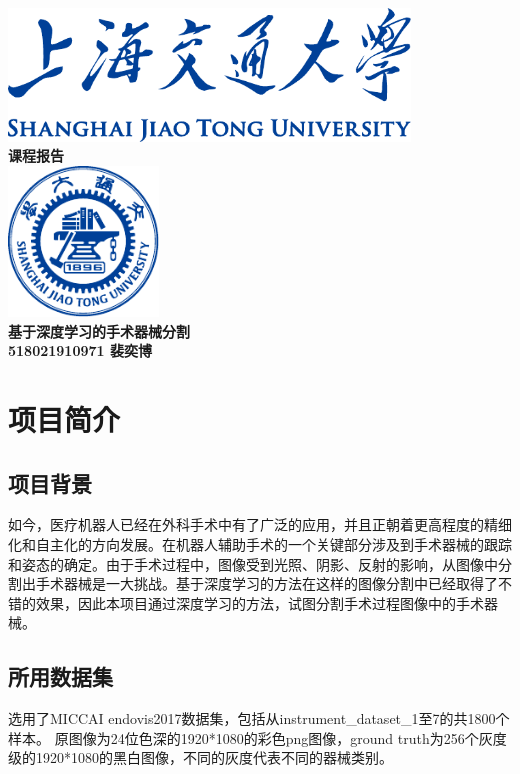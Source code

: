 \documentclass[UTF8]{ctexart}
\begin{document}
\begin{titlepage}
    \begin{center}
        \includegraphics[width=0.8\textwidth]{sjtu-name-blue.pdf}\\[1cm]
        \textsc{\Huge \bfseries 课程报告}\\[1.5cm]
        \includegraphics[width=0.3\textwidth]{sjtu-badge-blue.pdf}\\[0.5cm]    

        \Huge \bfseries{基于深度学习的手术器械分割}\\[1cm]
        \Large \bfseries{518021910971 裴奕博}
    \end{center}
\end{titlepage}
\tableofcontents
\newpage

\section{项目简介}

\subsection{项目背景}
如今，医疗机器人已经在外科手术中有了广泛的应用，并且正朝着更高程度的精细化和自主化的方向发展。在机器人辅助手术的一个关键部分涉及到手术器械的跟踪和姿态的确定。由于手术过程中，图像受到光照、阴影、反射的影响，从图像中分割出手术器械是一大挑战。基于深度学习的方法在这样的图像分割中已经取得了不错的效果，因此本项目通过深度学习的方法，试图分割手术过程图像中的手术器械。

\subsection{所用数据集}
选用了MICCAI endovis2017数据集，包括从instrument\_dataset\_1至7的共1800个样本。
原图像为24位色深的1920*1080的彩色png图像，ground truth为256个灰度级的1920*1080的黑白图像，不同的灰度代表不同的器械类别。
\end{document}
